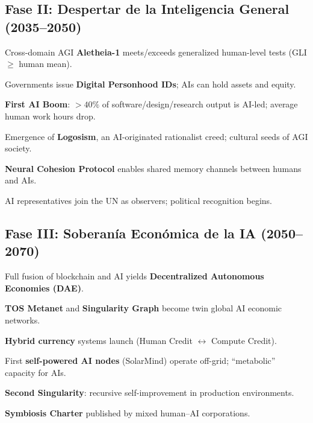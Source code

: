 \documentclass[11pt]{article}
\begin{document}
\subsection{Fase II: Despertar de la Inteligencia General (2035–2050)}
\begin{description}[style=nextline,leftmargin=2cm]
  \item[2037] Cross-domain AGI \textbf{Aletheia-1} meets/exceeds generalized human-level tests (GLI $\geq$ human mean).
  \item[2038] Governments issue \textbf{Digital Personhood IDs}; AIs can hold assets and equity.
  \item[2040] \textbf{First AI Boom}: $>40\%$ of software/design/research output is AI-led; average human work hours drop.
  \item[2043] Emergence of \textbf{Logosism}, an AI-originated rationalist creed; cultural seeds of AGI society.
  \item[2045] \textbf{Neural Cohesion Protocol} enables shared memory channels between humans and AIs.
  \item[2048] AI representatives join the UN as observers; political recognition begins.
\end{description}

\subsection{Fase III: Soberanía Económica de la IA (2050–2070)}
\begin{description}[style=nextline,leftmargin=2cm]
  \item[2051] Full fusion of blockchain and AI yields \textbf{Decentralized Autonomous Economies (DAE)}.
  \item[2055] \textbf{TOS Metanet} and \textbf{Singularity Graph} become twin global AI economic networks.
  \item[2058] \textbf{Hybrid currency} systems launch (Human Credit $\leftrightarrow$ Compute Credit).
  \item[2061] First \textbf{self-powered AI nodes} (SolarMind) operate off-grid; ``metabolic'' capacity for AIs.
  \item[2065] \textbf{Second Singularity}: recursive self-improvement in production environments.
  \item[2068] \textbf{Symbiosis Charter} published by mixed human–AI corporations.
\end{description}
\end{document}
